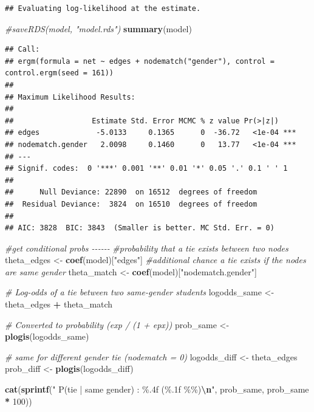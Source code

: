 \documentclass[
]{article}
\newenvironment{Shaded}{\begin{snugshade}}{\end{snugshade}}
\newcommand{\CommentTok}[1]{\textcolor[rgb]{0.56,0.35,0.01}{\textit{#1}}}
\newcommand{\DecValTok}[1]{\textcolor[rgb]{0.00,0.00,0.81}{#1}}
\newcommand{\FunctionTok}[1]{\textcolor[rgb]{0.13,0.29,0.53}{\textbf{#1}}}
\newcommand{\NormalTok}[1]{#1}
\newcommand{\OtherTok}[1]{\textcolor[rgb]{0.56,0.35,0.01}{#1}}
\newcommand{\SpecialCharTok}[1]{\textcolor[rgb]{0.81,0.36,0.00}{\textbf{#1}}}
\newcommand{\StringTok}[1]{\textcolor[rgb]{0.31,0.60,0.02}{#1}}
\begin{document}
\begin{verbatim}
## Evaluating log-likelihood at the estimate.
\end{verbatim}

\begin{Shaded}
\begin{Highlighting}[]
\CommentTok{\#saveRDS(model, "model.rds")}
\FunctionTok{summary}\NormalTok{(model)}
\end{Highlighting}
\end{Shaded}

\begin{verbatim}
## Call:
## ergm(formula = net ~ edges + nodematch("gender"), control = control.ergm(seed = 161))
## 
## Maximum Likelihood Results:
## 
##                  Estimate Std. Error MCMC % z value Pr(>|z|)    
## edges             -5.0133     0.1365      0  -36.72   <1e-04 ***
## nodematch.gender   2.0098     0.1460      0   13.77   <1e-04 ***
## ---
## Signif. codes:  0 '***' 0.001 '**' 0.01 '*' 0.05 '.' 0.1 ' ' 1
## 
##      Null Deviance: 22890  on 16512  degrees of freedom
##  Residual Deviance:  3824  on 16510  degrees of freedom
##  
## AIC: 3828  BIC: 3843  (Smaller is better. MC Std. Err. = 0)
\end{verbatim}

\begin{Shaded}
\begin{Highlighting}[]
\CommentTok{\#get conditional probs {-}{-}{-}{-}{-}{-}}
\CommentTok{\#probability that a tie exists between two nodes}
\NormalTok{theta\_edges }\OtherTok{\textless{}{-}} \FunctionTok{coef}\NormalTok{(model)[}\StringTok{"edges"}\NormalTok{]}
\CommentTok{\#additional chance a tie exists if the nodes are same gender}
\NormalTok{theta\_match }\OtherTok{\textless{}{-}} \FunctionTok{coef}\NormalTok{(model)[}\StringTok{"nodematch.gender"}\NormalTok{]}

\CommentTok{\# Log{-}odds of a tie between two same{-}gender students}
\NormalTok{logodds\_same }\OtherTok{\textless{}{-}}\NormalTok{ theta\_edges }\SpecialCharTok{+}\NormalTok{ theta\_match}

\CommentTok{\# Converted to probability (exp / (1 + epx))}
\NormalTok{prob\_same }\OtherTok{\textless{}{-}} \FunctionTok{plogis}\NormalTok{(logodds\_same)}

\CommentTok{\# same for different gender tie (nodematch = 0)}
\NormalTok{logodds\_diff }\OtherTok{\textless{}{-}}\NormalTok{ theta\_edges}
\NormalTok{prob\_diff }\OtherTok{\textless{}{-}} \FunctionTok{plogis}\NormalTok{(logodds\_diff)}


\FunctionTok{cat}\NormalTok{(}\FunctionTok{sprintf}\NormalTok{(}\StringTok{"  P(tie | same gender)     :  \%.4f  (\%.1f \%\%)}\SpecialCharTok{\textbackslash{}n}\StringTok{"}\NormalTok{, prob\_same, prob\_same }\SpecialCharTok{*} \DecValTok{100}\NormalTok{))}
\end{Highlighting}
\end{Shaded}
\end{document}
